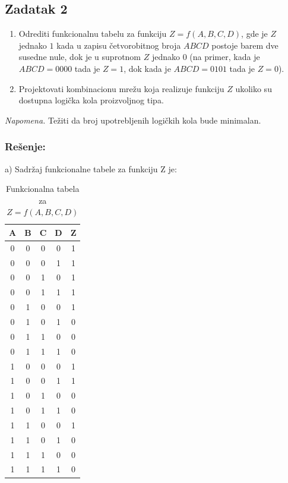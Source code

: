 \documentclass[a4paper,11pt]{article}
\numberwithin{equation}{section} %
\begin{document}
\clearpage

\subsection{Zadatak 2}


\begin{enumerate}[label=\alph*), leftmargin=*, itemsep=2pt]
  \item Odrediti funkcionalnu tabelu za funkciju $Z = f(A,B,C,D)$, gde je $Z$ jednako $1$ kada u zapisu
  četvorobitnog broja $ABCD$ postoje barem dve susedne nule, dok je u suprotnom $Z$ jednako $0$
  (na primer, kada je $ABCD=0000$ tada je $Z=1$, dok kada je $ABCD=0101$ tada je $Z=0$).

  \item Projektovati kombinacionu mrežu koja realizuje funkciju $Z$ ukoliko su dostupna logička
  kola proizvoljnog tipa.
\end{enumerate}

\noindent
\textit{Napomena.} Težiti da broj upotrebljenih logičkih kola bude minimalan.

\subsubsection*{Rešenje:} 

\noindent
a) Sadržaj funkcionalne tabele za funkciju Z je:

\begin{table}[!ht]
\centering
\caption{Funkcionalna tabela za $Z = f(A,B,C,D)$}\label{tab:zad22}
\begin{tabular}{|c|c|c|c|c|}
\hline
\rowcolor{gray!40}
A & B & C & D & Z \\ \hline
0 & 0 & 0 & 0 & 1 \\ \hline
0 & 0 & 0 & 1 & 1 \\ \hline
0 & 0 & 1 & 0 & 1 \\ \hline
0 & 0 & 1 & 1 & 1 \\ \hline
0 & 1 & 0 & 0 & 1 \\ \hline
0 & 1 & 0 & 1 & 0 \\ \hline
0 & 1 & 1 & 0 & 0 \\ \hline
0 & 1 & 1 & 1 & 0 \\ \hline
1 & 0 & 0 & 0 & 1 \\ \hline
1 & 0 & 0 & 1 & 1 \\ \hline
1 & 0 & 1 & 0 & 0 \\ \hline
1 & 0 & 1 & 1 & 0 \\ \hline
1 & 1 & 0 & 0 & 1 \\ \hline
1 & 1 & 0 & 1 & 0 \\ \hline
1 & 1 & 1 & 0 & 0 \\ \hline
1 & 1 & 1 & 1 & 0 \\ \hline
\end{tabular}
\end{table}
\end{document}
